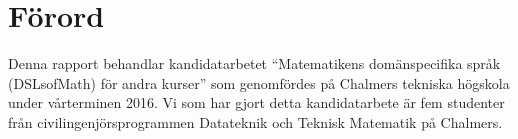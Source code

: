 \documentclass[12pt,a4paper,twoside,openright]{article}
\date{\today}
\begin{document}




\setlength{\parskip}{2mm}
\setlength{\parindent}{0pt}

%
%
%
%
%
%
%
%


\section*{Förord}
Denna rapport behandlar kandidatarbetet ``Matematikens domänspecifika
språk (DSLsofMath) för andra kurser'' som genomfördes på Chalmers
tekniska högskola under vårterminen 2016. Vi som har gjort detta
kandidatarbete är fem studenter från civilingenjörsprogrammen
Datateknik och Teknisk Matematik på Chalmers.
\end{document}
